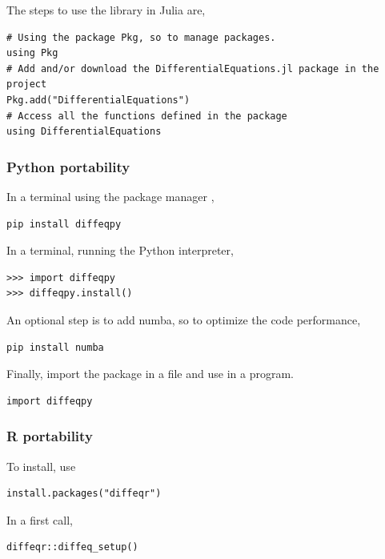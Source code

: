 \documentclass[
12pt,				%
openright,			%
oneside,			%
a4paper,			%
brazil,				%
english,			%
]{abntex2}
\begin{document}
The steps to use the library in Julia are,

\begin{verbatim}
# Using the package Pkg, so to manage packages. 
using Pkg
# Add and/or download the DifferentialEquations.jl package in the project 
Pkg.add("DifferentialEquations")
# Access all the functions defined in the package 
using DifferentialEquations
\end{verbatim}

\subsubsection{Python portability}

In a terminal using the package manager ,
\begin{verbatim}
pip install diffeqpy
\end{verbatim}

In a terminal, running the Python interpreter,
\begin{verbatim}
>>> import diffeqpy
>>> diffeqpy.install()
\end{verbatim}

An optional step is to add numba, so to optimize the code performance,
\begin{verbatim}
pip install numba
\end{verbatim}

Finally, import the package in a file and use in a program.
\begin{verbatim}
import diffeqpy
\end{verbatim}

\subsubsection{R portability}

To install, use
\begin{verbatim}
install.packages("diffeqr")
\end{verbatim}

In a first call,
\begin{verbatim}
diffeqr::diffeq_setup()
\end{verbatim}
\end{document}
